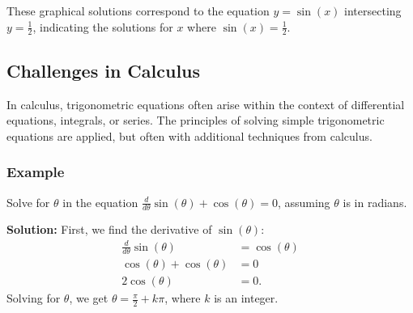 \documentclass[a4paper,12pt]{book}
\begin{document}
\begin{center}
\end{center}

These graphical solutions correspond to the equation \(y = \sin(x)\) intersecting \(y = \frac{1}{2}\), indicating the solutions for \(x\) where \(\sin(x) = \frac{1}{2}\).

\subsection{Challenges in Calculus}
\label{subsec:challenges_calculus}
In calculus, trigonometric equations often arise within the context of differential equations, integrals, or series. The principles of solving simple trigonometric equations are applied, but often with additional techniques from calculus.

\subsubsection{Example}
Solve for \(\theta\) in the equation \(\frac{d}{d\theta}\sin(\theta) + \cos(\theta) = 0\), assuming \(\theta\) is in radians.

\textbf{Solution:}
First, we find the derivative of \(\sin(\theta)\):
\begin{align*}
\frac{d}{d\theta}\sin(\theta) &= \cos(\theta) \\
\cos(\theta) + \cos(\theta) &= 0 \\
2\cos(\theta) &= 0.
\end{align*}
Solving for \(\theta\), we get \(\theta = \frac{\pi}{2} + k\pi\), where \(k\) is an integer.
\end{document}
